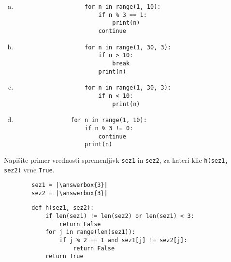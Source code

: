 \documentclass[arhiv, 10pt]{../izpit}
\newcommand{\inlinepy}[1]{\texttt{#1}}
\newcommand{\answerbox}[1]{\framebox{\vphantom{\large M}\hspace{#1cm}}}
\begin{document}
        \begin{multicols}{2}
        \begin{enumerate}[(a)]
\item 
                \begin{verbatim}
                    for n in range(1, 10):
                        if n % 3 == 1:
                            print(n)
                        continue
                \end{verbatim}
            
\item 
                \begin{verbatim}
                    for n in range(1, 30, 3):
                        if n > 10:
                            break
                        print(n)
                \end{verbatim}
            
\item 
                \begin{verbatim}
                    for n in range(1, 30, 3):
                        if n < 10:
                            print(n)
                \end{verbatim}
            
\item 
            \begin{verbatim}
                for n in range(1, 10):
                    if n % 3 != 0:
                        continue
                    print(n)
            \end{verbatim}
        
\end{enumerate}

        \end{multicols}
    
        \naloga*
        \begin{multicols}{2}
        \noindent
        Napišite primer vrednosti spremenljivk \inlinepy{sez1} in \inlinepy{sez2}, za kateri klic \inlinepy{h(sez1, sez2)} vrne \inlinepy{True}.
        \begin{verbatim}
        sez1 = |\answerbox{3}|
        sez2 = |\answerbox{3}|
        \end{verbatim}
        \vfil
        \columnbreak
        \begin{verbatim}
        def h(sez1, sez2):
            if len(sez1) != len(sez2) or len(sez1) < 3:
                return False
            for j in range(len(sez1)):
                if j % 2 == 1 and sez1[j] != sez2[j]:
                    return False
            return True
        \end{verbatim}
        \end{multicols}
    
\end{document}
